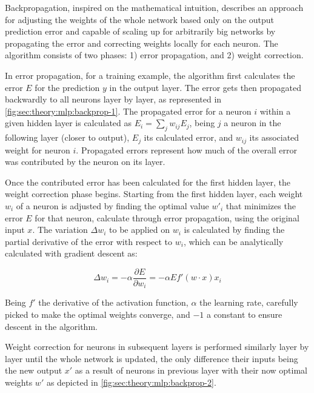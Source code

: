 Backpropagation, inspired on the mathematical intuition, describes an approach for adjusting the weights of the whole network based only on the output prediction error and capable of scaling up for arbitrarily big networks by propagating the error and correcting weights locally for each neuron.
The algorithm consists of two phases: 1) error propagation, and 2) weight correction.

In error propagation, for a training example, the algorithm first calculates the error $E$ for the prediction $y$ in the output layer.
The error gets then propagated backwardly to all neurons layer by layer, as represented in \autoref{fig:sec:theory:mlp:backprop-1}.
The propagated error for a neuron $i$ within a given hidden layer is calculated as $E_{i} = \sum_j w_{ij} E_{j}$, being $j$ a neuron in the following layer (closer to output), $E_{j}$ its calculated error, and $w_{ij}$ its associated weight for neuron $i$.
Propagated errors represent how much of the overall error was contributed by the neuron on its layer.

Once the contributed error has been calculated for the first hidden layer, the weight correction phase begins.
Starting from the first hidden layer, each weight $w_i$ of a neuron is adjusted by finding the optimal value $w'_i$ that minimizes the error $E$ for that neuron, calculate through error propagation, using the original input $x$.
The variation $\Delta w_i$ to be applied on $w_i$ is calculated by finding the partial derivative of the error with respect to $w_i$, which can be analytically calculated with gradient descent as:

\begin{equation}
  \Delta w_i =
    -\alpha \frac{\partial E}{\partial w_i} =
    -\alpha E f'({w}\cdot{x}) x_i
\end{equation}

Being $f'$ the derivative of the activation function, $\alpha$ the learning rate, carefully picked to make the optimal weights converge, and $-1$ a constant to ensure descent in the algorithm.

Weight correction for neurons in subsequent layers is performed similarly layer by layer until the whole network is updated, the only difference their inputs being the new output $x'$ as a result of neurons in previous layer with their now optimal weights $w'$ as depicted in \autoref{fig:sec:theory:mlp:backprop-2}.

